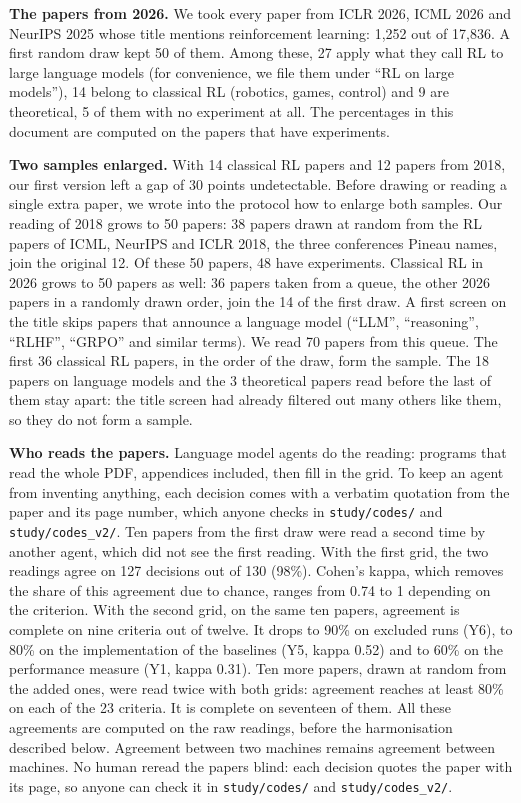 \documentclass[11pt,a4paper]{article}
\begin{document}
\textbf{The papers from 2026.} We took every paper from ICLR 2026, ICML
2026 and NeurIPS 2025 whose title mentions reinforcement learning: 1,252
out of 17,836. A first random draw kept 50 of them. Among these, 27
apply what they call RL to large language models (for convenience, we
file them under ``RL on large models''), 14 belong to classical RL
(robotics, games, control) and 9 are theoretical, 5 of them with no
experiment at all. The percentages in this document are computed on the
papers that have experiments.

\textbf{Two samples enlarged.} With 14 classical RL papers and 12 papers
from 2018, our first version left a gap of 30 points undetectable.
Before drawing or reading a single extra paper, we wrote into the
protocol how to enlarge both samples. Our reading of 2018 grows to 50
papers: 38 papers drawn at random from the RL papers of ICML, NeurIPS
and ICLR 2018, the three conferences Pineau names, join the original 12.
Of these 50 papers, 48 have experiments. Classical RL in 2026 grows to
50 papers as well: 36 papers taken from a queue, the other 2026 papers
in a randomly drawn order, join the 14 of the first draw. A first screen
on the title skips papers that announce a language model (``LLM'',
``reasoning'', ``RLHF'', ``GRPO'' and similar terms). We read 70 papers
from this queue. The first 36 classical RL papers, in the order of the
draw, form the sample. The 18 papers on language models and the 3
theoretical papers read before the last of them stay apart: the title
screen had already filtered out many others like them, so they do not
form a sample.

\textbf{Who reads the papers.} Language model agents do the reading:
programs that read the whole PDF, appendices included, then fill in the
grid. To keep an agent from inventing anything, each decision comes with
a verbatim quotation from the paper and its page number, which anyone
checks in \texttt{study/codes/} and \texttt{study/codes\_v2/}. Ten
papers from the first draw were read a second time by another agent,
which did not see the first reading. With the first grid, the two
readings agree on 127 decisions out of 130 (98\%). Cohen's kappa, which
removes the share of this agreement due to chance, ranges from 0.74 to 1
depending on the criterion. With the second grid, on the same ten
papers, agreement is complete on nine criteria out of twelve. It drops
to 90\% on excluded runs (Y6), to 80\% on the implementation of the
baselines (Y5, kappa 0.52) and to 60\% on the performance measure (Y1,
kappa 0.31). Ten more papers, drawn at random from the added ones, were
read twice with both grids: agreement reaches at least 80\% on each of
the 23 criteria. It is complete on seventeen of them. All these
agreements are computed on the raw readings, before the harmonisation
described below. Agreement between two machines remains agreement
between machines. No human reread the papers blind: each decision quotes
the paper with its page, so anyone can check it in \texttt{study/codes/}
and \texttt{study/codes\_v2/}.
\end{document}
